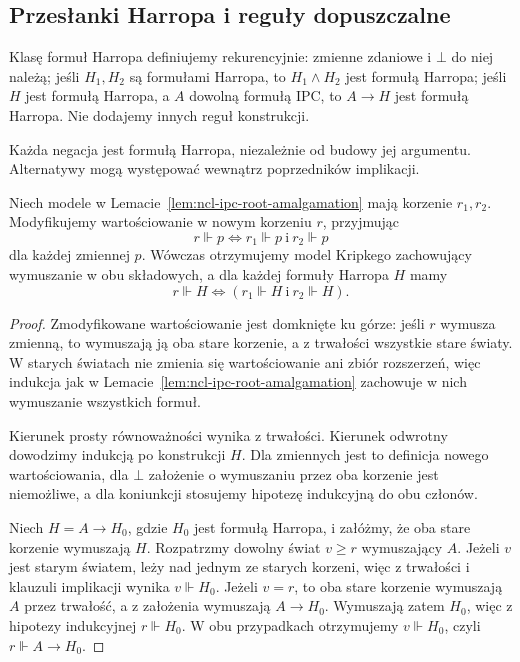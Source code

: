 \subsection{Przesłanki Harropa i reguły dopuszczalne}

\begin{definicja}
\label{def:ncl-ipc-harrop}
Klasę formuł Harropa definiujemy rekurencyjnie:
zmienne zdaniowe i $\bot$ do niej należą; jeśli
$H_1,H_2$ są formułami Harropa, to $H_1\wedge H_2$
jest formułą Harropa; jeśli $H$ jest formułą Harropa,
a $A$ dowolną formułą IPC, to $A\to H$ jest formułą
Harropa. Nie dodajemy innych reguł konstrukcji.
\end{definicja}
Każda negacja jest formułą Harropa, niezależnie
od budowy jej argumentu. Alternatywy mogą występować
wewnątrz poprzedników implikacji.

\begin{lemat}
\label{lem:ncl-ipc-harrop-joining}
Niech modele w Lemacie~\ref{lem:ncl-ipc-root-amalgamation}
mają korzenie $r_1,r_2$. Modyfikujemy wartościowanie
w nowym korzeniu $r$, przyjmując
\[
 r\Vdash p\iff r_1\Vdash p\ \text{i}\ r_2\Vdash p
\]
dla każdej zmiennej $p$. Wówczas otrzymujemy model
Kripkego zachowujący wymuszanie w obu składowych,
a dla każdej formuły Harropa $H$ mamy
\[
 r\Vdash H\iff (r_1\Vdash H\ \text{i}\ r_2\Vdash H).
\]
\end{lemat}
\begin{proof}
Zmodyfikowane wartościowanie jest domknięte ku górze:
jeśli $r$ wymusza zmienną, to wymuszają ją oba stare
korzenie, a z trwałości wszystkie stare światy.
W starych światach nie zmienia się wartościowanie ani
zbiór rozszerzeń, więc indukcja jak w
Lemacie~\ref{lem:ncl-ipc-root-amalgamation} zachowuje
w nich wymuszanie wszystkich formuł.

Kierunek prosty równoważności wynika z trwałości.
Kierunek odwrotny dowodzimy indukcją po konstrukcji
$H$. Dla zmiennych jest to definicja nowego
wartościowania, dla $\bot$ założenie o wymuszaniu
przez oba korzenie jest niemożliwe, a dla koniunkcji
stosujemy hipotezę indukcyjną do obu członów.

Niech $H=A\to H_0$, gdzie $H_0$ jest formułą
Harropa, i załóżmy, że oba stare korzenie wymuszają
$H$. Rozpatrzmy dowolny świat $v\geq r$ wymuszający
$A$. Jeżeli $v$ jest starym światem, leży nad jednym
ze starych korzeni, więc z trwałości i klauzuli
implikacji wynika $v\Vdash H_0$.
Jeżeli $v=r$, to oba stare korzenie wymuszają $A$
przez trwałość, a z założenia wymuszają $A\to H_0$.
Wymuszają zatem $H_0$, więc z hipotezy indukcyjnej
$r\Vdash H_0$. W obu przypadkach otrzymujemy
$v\Vdash H_0$, czyli $r\Vdash A\to H_0$.
\end{proof}

